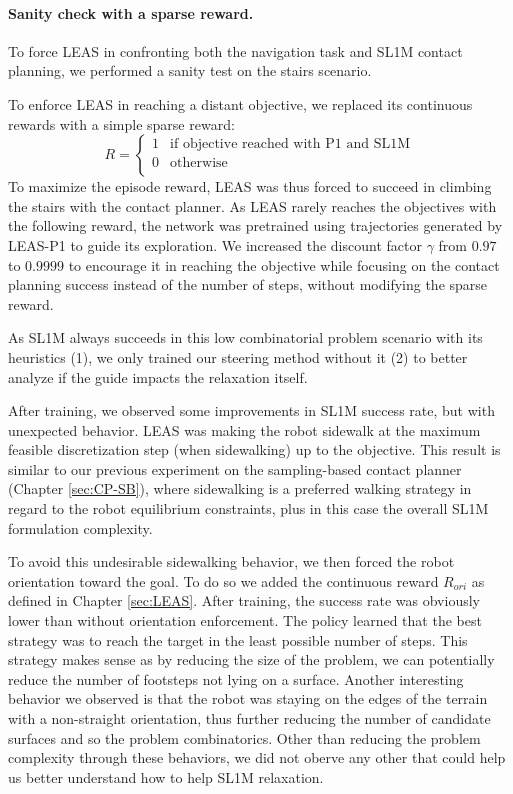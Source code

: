 \paragraph{Sanity check with a sparse reward.}
To force LEAS in confronting both the navigation task and SL1M contact planning, we performed a sanity test on the stairs scenario.

To enforce LEAS in reaching a distant objective, we replaced its continuous rewards with a simple sparse reward:
\begin{equation}
    R = \left\{
    \begin{array}{ll}
        1 & \mbox{if objective reached with P1 and SL1M}\\
        0 & \mbox{otherwise}\\
    \end{array}
\right.
\end{equation}
To maximize the episode reward, LEAS was thus forced to succeed in climbing the stairs with the contact planner.
As LEAS rarely reaches the objectives with the following reward, the network was pretrained using trajectories generated by LEAS-P1 to guide its exploration.
We increased the discount factor $\gamma$ from $0.97$ to $0.9999$ to encourage it in reaching the objective while focusing on the contact planning success instead of the number of steps, without modifying the sparse reward.

As SL1M always succeeds in this low combinatorial problem scenario with its heuristics (1), we only trained our steering method without it (2) to better analyze if the guide impacts the relaxation itself.


After training, we observed some improvements in SL1M success rate, but with unexpected behavior.
LEAS was making the robot sidewalk at the maximum feasible discretization step (when sidewalking) up to the objective.
This result is similar to our previous experiment on the sampling-based contact planner (Chapter \ref{sec:CP-SB}), where sidewalking is a preferred walking strategy in regard to the robot equilibrium constraints, plus in this case the overall SL1M formulation complexity.

To avoid this undesirable sidewalking behavior, we then forced the robot orientation toward the goal. To do so we added the continuous reward $R_{ori}$ as defined in Chapter \ref{sec:LEAS}.
After training, the success rate was obviously lower than without orientation enforcement.
The policy learned that the best strategy was to reach the target in the least possible number of steps.
This strategy makes sense as by reducing the size of the problem, we can potentially reduce the number of footsteps not lying on a surface.
Another interesting behavior we observed is that the robot was staying on the edges of the terrain with a non-straight orientation, thus further reducing the number of candidate surfaces and so the problem combinatorics.
Other than reducing the problem complexity through these behaviors, we did not oberve any other that could help us better understand how to help SL1M relaxation.

